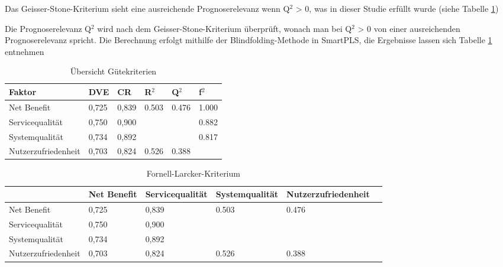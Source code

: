 Das Geisser-Stone-Kriterium sieht eine ausreichende Prognoserelevanz wenn Q$^2$ > 0, was in dieser Studie erfüllt wurde (siehe Tabelle \ref{tab:Übersicht Gütekriterien}) 

Die Prognoserelevanz Q$^2$ wird nach dem Geisser-Stone-Kriterium überprüft, wonach man bei Q$^2$ > 0 von einer ausreichenden Prognoserelevanz spricht. Die Berechnung erfolgt mithilfe der Blindfolding-Methode in SmartPLS, die Ergebnisse lassen sich Tabelle \ref{tab:Übersicht Gütekriterien} entnehmen
 





\begin{table}[h] 
\caption{Übersicht Gütekriterien}
\label{tab:Übersicht Gütekriterien} 
\begin{tabular}{@{}llllll@{}} \toprule

\textbf{Faktor} & \textbf{DVE} & \textbf{CR} & \textbf{R$^2$} & \textbf{Q$^2$} & \textbf{f$^2$} \\ \midrule

 Net Benefit 		& 0,725 		& 0,839 & 0.503 & 0.476 		& 1.000 \\
 
 Servicequalität 	& 0,750 		& 0,900 & 		& 			& 0.882 \\

 Systemqualität 	& 0,734 		& 0,892 & 		& 			& 0.817 \\

 Nutzerzufriedenheit & 0,703 	& 0,824 	& 0.526 	& 0.388		&  	 \\ \bottomrule
\end{tabular}	
\end{table}



\begin{table}[h] 
\footnotesize
\caption{Fornell-Larcker-Kriterium}
\label{tab:Fornell-Larcker-Kriterium} 
\begin{tabular}{@{}llllll@{}} \toprule

 & \textbf{Net Benefit} & \textbf{Servicequalität} & \textbf{Systemqualität} & \textbf{Nutzerzufriedenheit} \\ \midrule

 Net Benefit 		& 0,725 		& 0,839 & 0.503 & 0.476 		\\
 
 Servicequalität 	& 0,750 		& 0,900 & 		& 			\\

 Systemqualität 	& 0,734 		& 0,892 & 		& 			 \\

 Nutzerzufriedenheit & 0,703 	& 0,824 	& 0.526 	& 0.388		 	 \\ \bottomrule
\end{tabular}	
\end{table}


